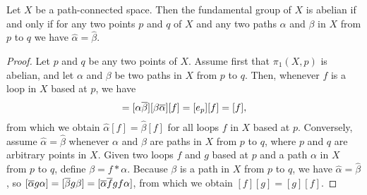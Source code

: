 \begin{prop}
    Let $X$ be a path-connected space.
    Then the fundamental group of $X$ is abelian if and only if for any two points $p$ and $q$ of $X$ and any two paths $\alpha$ and $\beta$ in $X$ from $p$ to $q$ we have $\widehat\alpha=\widehat\beta$.
\end{prop}
\begin{proof}
    Let $p$ and $q$ be any two points of $X$.
    Assume first that $\pi_1(X, p)$ is abelian, and let $\alpha$ and $\beta$ be two paths in $X$ from $p$ to $q$.
    Then, whenever $f$ is a loop in $X$ based at $p$, we have
    \begin{align*}
        [\alpha \ol\beta][f][\beta \ol\alpha]=[\alpha \ol\beta][\beta \ol\alpha][f]=[e_p][f]=[f],
    \end{align*}
    from which we obtain $\widehat\alpha[f]=\widehat\beta[f]$ for all loops $f$ in $X$ based at $p$.
    Conversely, assume $\widehat\alpha=\widehat\beta$ whenever $\alpha$ and $\beta$ are paths in $X$ from $p$ to $q$, where $p$ and $q$ are arbitrary points in $X$.
    Given two loops $f$ and $g$ based at $p$ and a path $\alpha$ in $X$ from $p$ to $q$, define $\beta=f*\alpha$.
    Because $\beta$ is a path in $X$ from $p$ to $q$, we have $\widehat\alpha=\widehat\beta$, so $[\overline{\alpha} g \alpha]=[\overline{\beta} g \beta]=[\overline{\alpha} \overline{f} g f \alpha]$, from which we obtain $[f][g]=[g][f]$.
\end{proof}